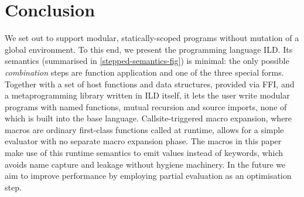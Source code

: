 \section{Conclusion}
We set out to support modular, statically-scoped
programs without mutation of a global environment. To this end, we present the
programming language ILD. Its semantics (summarised in \cref{stepped-semantics-fig})
is minimal: the only possible \emph{combination} steps are function application and
one of the three special forms. Together with a set of host functions
and data structures, provided via FFI, and a metaprogramming library written in ILD itself,
it lets the user write modular programs
with named functions, mutual recursion and source imports, none of which
is built into the base language. Callsite-triggered macro expansion,
where macros are ordinary first-class functions called at runtime,
allows for a simple evaluator with no separate macro expansion phase.
The macros in this paper make use of this runtime semantics to
emit values instead of keywords, which avoids name capture and leakage without
hygiene machinery.
In the future we aim to improve performance
by employing partial evaluation as an optimisation step.
